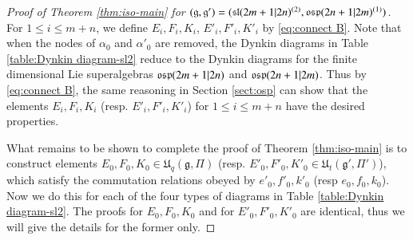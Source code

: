 \documentclass[12pt]{amsart}
\theoremstyle{definition}
\theoremstyle{remark}
\numberwithin{equation}{section}
\begin{document}
\begin{proof}[Proof of Theorem \ref{thm:iso-main} for $({{\mathfrak g}}, {{\mathfrak g}}')=({{\rm\mathfrak{sl}}}(2m+1|2n)^{(2)}, {{\rm\mathfrak{osp}}}(2n+1|2m)^{(1)})$] For $1\le i\le m+n$, we define $E_i, F_i, K_i$, $E'_i, F'_i, K'_i$   by \eqref{eq:connect B}.
Note that when the nodes of $\alpha_0$ and $\alpha'_0$ are removed,
the Dynkin diagrams in Table \ref{table:Dynkin diagram-sl2}  reduce to the Dynkin diagrams for the finite dimensional Lie superalgebras ${{\rm\mathfrak{osp}}}(2m+1|2n)$ and ${{\rm\mathfrak{osp}}}(2n+1|2m)$.
Thus by \eqref{eq:connect B}, the same reasoning in Section \ref{sect:osp} can show
that the elements
$E_i, F_i, K_i$ (resp. $E'_i, F'_i, K'_i$)  for $1\le i\le m+n$ have
the desired properties.

What remains to be shown to complete the proof of
Theorem \ref{thm:iso-main}  is to construct elements
$E_0, F_0, K_0\in {{\mathfrak U}}_q({{\mathfrak g}}, \Pi)$ (resp. $E'_0, F'_0, K'_0\in {{\mathfrak U}}_t({{\mathfrak g}}', \Pi')$),
which satisfy the commutation relations obeyed by $e'_0, f'_0, k'_0$ (resp $e_0, f_0, k_0$).  Now we do this for each of the four types of diagrams in
Table \ref{table:Dynkin diagram-sl2}.
The proofs for $E_0, F_0, K_0$  and  for $E'_0, F'_0, K'_0$ are identical, thus we will give the details for the former only.


\end{proof}
\end{document}
